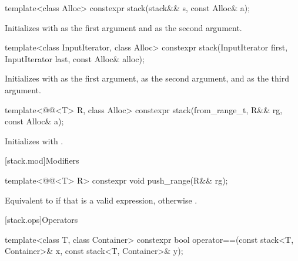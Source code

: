 %
\begin{itemdecl}
template<class Alloc> constexpr stack(stack&& s, const Alloc& a);
\end{itemdecl}

\begin{itemdescr}
\pnum
\effects
Initializes  with  as the first argument and 
as the second argument.
\end{itemdescr}

%
\begin{itemdecl}
template<class InputIterator, class Alloc>
  constexpr stack(InputIterator first, InputIterator last, const Alloc& alloc);
\end{itemdecl}

\begin{itemdescr}
\pnum
\effects
Initializes  with
 as the first argument,
 as the second argument, and
 as the third argument.
\end{itemdescr}

%
\begin{itemdecl}
template<@@<T> R, class Alloc>
  constexpr stack(from_range_t, R&& rg, const Alloc& a);
\end{itemdecl}

\begin{itemdescr}
\pnum
\effects
Initializes
 with .
\end{itemdescr}

[stack.mod]{Modifiers}

%
\begin{itemdecl}
template<@@<T> R>
  constexpr void push_range(R&& rg);
\end{itemdecl}

\begin{itemdescr}
\pnum
\effects
Equivalent to 
if that is a valid expression,
otherwise .
\end{itemdescr}

[stack.ops]{Operators}

%
\begin{itemdecl}
template<class T, class Container>
  constexpr bool operator==(const stack<T, Container>& x, const stack<T, Container>& y);
\end{itemdecl}

